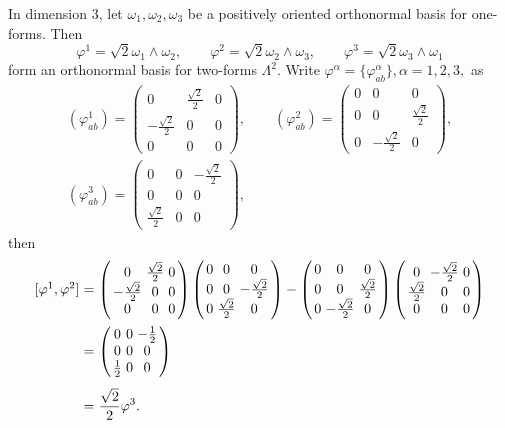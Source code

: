 In dimension $3$, let $\omega_1,\omega_2,\omega_3$ be a positively
oriented orthonormal basis for one-forms. Then
$$
\varphi^1=\sqrt{2}\omega_1\wedge\omega_2,\qquad\varphi^2
=\sqrt{2}\omega_2\wedge\omega_3,
\qquad\varphi^3=\sqrt{2}\omega_3\wedge\omega_1
$$
form an orthonormal basis for two-forms $\Lambda^2$. Write
$\varphi ^{\alpha} = \{\varphi ^{\alpha}_{ab}\}, \alpha =1,2,3,$
as
\begin{gather*}
(\varphi^1_{ab})= \begin{pmatrix}
0& \frac{\sqrt{2}}{2}& 0\\
-\frac{\sqrt{2}}{2}& 0&  0\\
0&  0&  0\end{pmatrix},\qquad (\varphi^2_{ab})=\begin{pmatrix} 0&
0& 0\\0& 0& \frac{\sqrt{2}}{2}\\0& -\frac{\sqrt{2}}{2}&
0\end{pmatrix},\\
(\varphi^3_{ab})=\begin{pmatrix} 0& 0& -\frac{\sqrt{2}}{2}\\0& 0&
0\\\frac{\sqrt{2}}{2}& 0& 0\end{pmatrix},
\end{gather*}
then
$$\arraycolsep=1.5pt\begin{array}{rcl}
[\varphi^1,\varphi^2]&  =&  \left(\begin{array}{ccc} 0&
\frac{\sqrt{2}}{2}& 0\\
-\frac{\sqrt{2}}{2}& 0& 0\\0& 0&
0\end{array}\right)\left(\begin{array}{ccc} 0& 0& 0\\0& 0&
-\frac{\sqrt{2}}{2}\\0& \frac{\sqrt{2}}{2}&
0\end{array}\right)-\left(\begin{array}{ccc} 0& 0& 0\\0& 0&
\frac{\sqrt{2}}{2}\\0& -\frac{\sqrt{2}}{2}&
0\end{array}\right)\left(\begin{array}{ccc}
0&  -\frac{\sqrt{2}}{2}&  0\\
\frac{\sqrt{2}}{2}&  0&  0\\
0&  0&  0\end{array}\right)\\[7mm]
&  =&  \left(\begin{array}{ccc}
0&  0&  -\frac{1}{2}\\0&  0&  0\\
\frac{1}{2}&  0&  0\end{array}\right)\\[7mm]
&  =& {\displaystyle \frac{\sqrt{2}}{2}\varphi^3.}
\end{array}
$$

